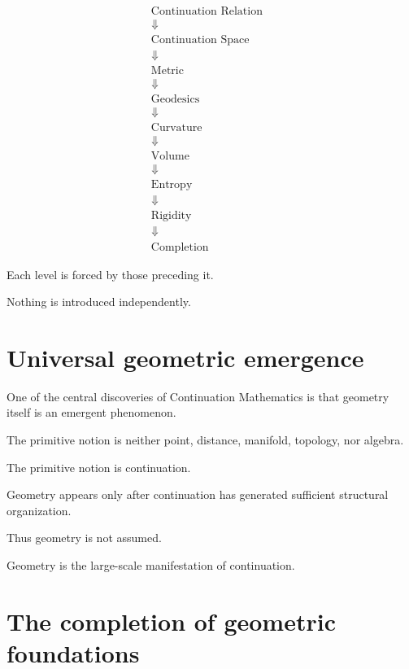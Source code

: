 \documentclass[13pt,openany]{book}
\theoremstyle{plain}
\theoremstyle{definition}
\begin{document}
\[
\begin{aligned}
\text{Continuation Relation}
&\\
\Downarrow
\\
\text{Continuation Space}
&\\
\Downarrow
\\
\text{Metric}
&\\
\Downarrow
\\
\text{Geodesics}
&\\
\Downarrow
\\
\text{Curvature}
&\\
\Downarrow
\\
\text{Volume}
&\\
\Downarrow
\\
\text{Entropy}
&\\
\Downarrow
\\
\text{Rigidity}
&\\
\Downarrow
\\
\text{Completion}
\end{aligned}
\]

Each level is forced by those preceding it.

Nothing is introduced independently.


\section{Universal geometric emergence}

One of the central discoveries of Continuation Mathematics is that geometry itself is an emergent phenomenon.

The primitive notion is neither point, distance, manifold, topology, nor algebra.

The primitive notion is continuation.

Geometry appears only after continuation has generated sufficient structural organization.

Thus geometry is not assumed.

Geometry is the large-scale manifestation of continuation.


\section{The completion of geometric foundations}
\end{document}
